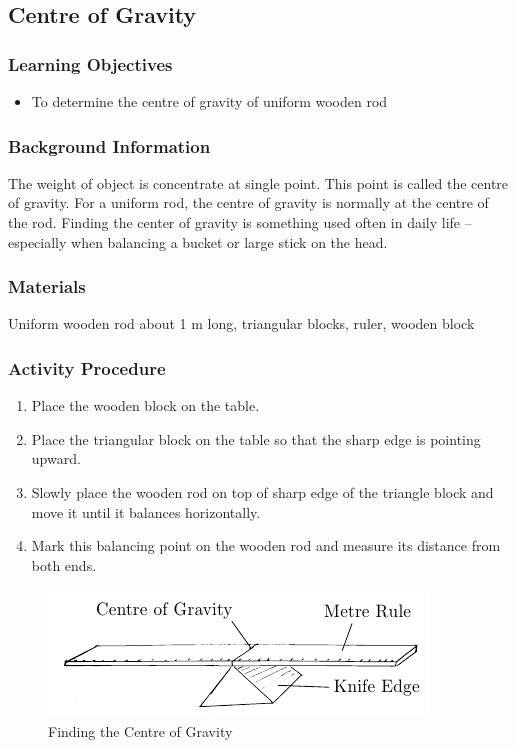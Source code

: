 
\subsection{Centre of Gravity}

\subsubsection*{Learning Objectives}
\begin{itemize}
\item{To determine the centre of gravity of uniform wooden rod} 
\end{itemize}

\subsubsection*{Background Information}
The weight of object is concentrate at single point. This point is called the centre of gravity. For a uniform rod, the centre of gravity is normally at the centre of the rod.  Finding the center of gravity is something used often in daily life -- especially when balancing a bucket or large stick on the head.

\subsubsection*{Materials}
Uniform wooden rod about 1 m long, triangular blocks, ruler, wooden block

\subsubsection*{Activity Procedure}
\begin{enumerate}
\item{Place the wooden block on the table.} 
\item{Place the triangular block on the table so that the sharp edge is pointing upward.} 
\item{Slowly place the wooden rod on top of sharp edge of the triangle block and move it until it balances horizontally.} 
\item{Mark this balancing point on the wooden rod and measure its distance from both ends.} 
\end{enumerate}

\begin{figure}
\begin{center}
\includegraphics{./img/centre-of-gravity.png}
\caption{Finding the Centre of Gravity}
\label{fig:center-of-gravity}
\end{center}
\end{figure}

